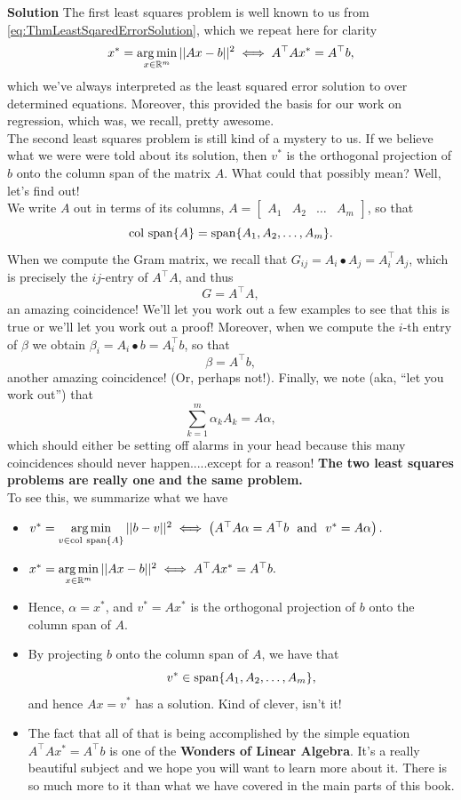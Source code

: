 \textbf{Solution}
The first least squares problem is well known to us from \eqref{eq:ThmLeastSqaredErrorSolution}, which we repeat here for clarity
$$x^\ast = \operatorname*{arg\,min}\limits_{x \in \mathbb R^m} || Ax-b||^2 \iff A^\top A x^\ast =A^\top b,$$
which we've always interpreted as the least squared error solution to over determined equations. Moreover, this provided the basis for our work on regression, which was, we recall, pretty awesome. \\

The second least squares problem is still kind of a mystery to us. If we believe what we were were told about its solution, then $v^\ast$ is the orthogonal projection of $b$ onto the column span of the matrix $A$. What could that possibly mean? Well, let's find out!\\

We write $A$ out in terms of its columns, $A = \left[ \begin{array}{cccc}A_1 & A_2 & \ldots & A_m \end{array}\right]$, so that
$$\mathrm{col~span} \{ A \} = \mathrm{span} \{ A_1, A_2, \ldots, A_m \}.$$
When we compute the Gram matrix, we recall that $G_{ij} =  A_i \bullet A_j = A_i^\top A_j$, which is precisely the $ij$-entry of $A^\top A$, and thus
$$G =  A^\top A, $$
an amazing coincidence! We'll let you work out a few examples to see that this is true or we'll let you work out a proof! Moreover, when we compute the $i$-th entry of $\beta$ we obtain
$\beta_i = A_i \bullet b = A_i^\top b$, so that
$$\beta = A^\top b, $$
another amazing coincidence! (Or, perhaps not!). Finally, we note (aka, ``let you work out'') that
$$\sum_{k=1}^m \alpha_k A_k = A \alpha, $$
which should either be setting off alarms in your head because this many coincidences should never happen.....except for a reason! \textbf{The two least squares problems are really one and the same problem.}\\

To see this, we summarize what we have
\begin{itemize}
    \item $v^\ast =  \operatorname*{arg\,min}\limits_{v \in \mathrm{col~span} \{ A \}}||b-v||^2 \iff  \left(A^\top A \alpha = A^\top b~~\text{and}~~v^\ast = A \alpha \right).$
    \item $x^\ast = \operatorname*{arg\,min}\limits_{x \in \mathbb R^m} || Ax-b||^2 \iff A^\top A x^\ast =A^\top b.$
    \item Hence, $\alpha = x^\ast$, and $v^\ast = A x^\ast$ is the orthogonal projection of $b$ onto the column span of $A$. 
    \item By projecting $b$ onto the column span of $A$, we have that 
    $$v^\ast \in \mathrm{span} \{ A_1, A_2, \ldots, A_m \},$$
    and hence $A x = v^\ast$ has a solution. Kind of clever, isn't it! 
    \item The fact that all of that is being accomplished by the simple equation $A^\top A x^\ast =A^\top b$ is one of the \textbf{Wonders of Linear Algebra}. It's a really beautiful subject and we hope you will want to learn more about it. There is so much more to it than what we have covered in the main parts of this book.
\end{itemize}
\Qed


